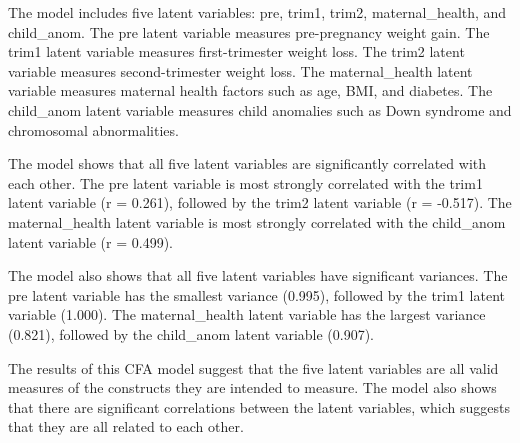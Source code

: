 \documentclass[
  letterpaper,
  DIV=11,
  numbers=noendperiod]{scrartcl}
\begin{document}
The model includes five latent variables: pre, trim1, trim2,
maternal\_health, and child\_anom. The pre latent variable measures
pre-pregnancy weight gain. The trim1 latent variable measures
first-trimester weight loss. The trim2 latent variable measures
second-trimester weight loss. The maternal\_health latent variable
measures maternal health factors such as age, BMI, and diabetes. The
child\_anom latent variable measures child anomalies such as Down
syndrome and chromosomal abnormalities.

The model shows that all five latent variables are significantly
correlated with each other. The pre latent variable is most strongly
correlated with the trim1 latent variable (r = 0.261), followed by the
trim2 latent variable (r = -0.517). The maternal\_health latent variable
is most strongly correlated with the child\_anom latent variable (r =
0.499).

The model also shows that all five latent variables have significant
variances. The pre latent variable has the smallest variance (0.995),
followed by the trim1 latent variable (1.000). The maternal\_health
latent variable has the largest variance (0.821), followed by the
child\_anom latent variable (0.907).

The results of this CFA model suggest that the five latent variables are
all valid measures of the constructs they are intended to measure. The
model also shows that there are significant correlations between the
latent variables, which suggests that they are all related to each
other.
\end{document}
